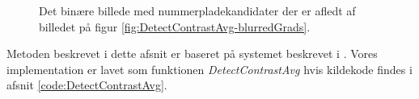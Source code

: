 \begin{figure}[htp]
  \centering
  \caption{Det binære billede med nummerpladekandidater der er afledt af billedet på figur \vref{fig:DetectContrastAvg-blurredGrads}.}
  \label{fig:DetectContrastAvg-binary}
\end{figure}

Metoden beskrevet i dette afsnit er baseret på systemet beskrevet i \cite{shapiro}. Vores implementation er lavet som funktionen \textit{DetectContrastAvg} hvis kildekode findes i afsnit \vref{code:DetectContrastAvg}.

